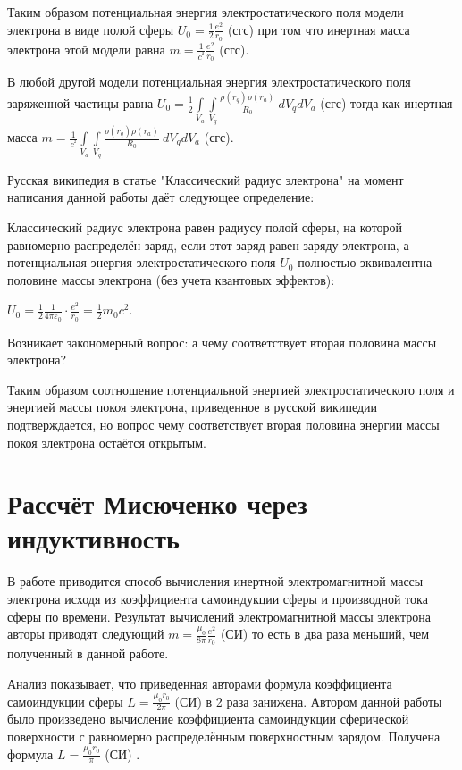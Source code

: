 \documentclass{article}
\begin{document}
Таким образом потенциальная энергия электростатического поля модели электрона в виде полой сферы 
${U}_{0} =\frac{1}{2}\frac{e^2}{{{r}_{0}}}$ (сгс)
при том что инертная масса электрона этой модели равна
$m =\frac{1}{{{c}^{^{2}}}}\frac{e^2}{{{r}_{0}}}$ (сгс).

В любой другой модели потенциальная энергия электростатического поля заряженной частицы равна
${U}_{0}=\frac{1}{2}\int\limits_{{{V}_{a}}}{\int\limits_{{{V}_{q}}}{\frac{\rho \left( {{r}_{q}} \right)\rho \left( {{r}_{a}} \right)}{R_{0}}}}\ d{{V}_{q}}d{{V}_{a}}$ (сгс)
тогда как инертная масса 
$m=\frac{1}{{{c}^{^{2}}}}\int\limits_{{{V}_{a}}}{\int\limits_{{{V}_{q}}}{\frac{\rho \left( {{r}_{q}} \right)\rho \left( {{r}_{a}} \right)}{R_{0}}}}\ d{{V}_{q}}d{{V}_{a}}$ (сгс).

Русская википедия в статье "Классический радиус электрона"  на момент написания данной работы даёт следующее определение:

Классический радиус электрона равен радиусу полой сферы, на которой равномерно распределён заряд, если этот заряд равен заряду электрона, а потенциальная энергия электростатического поля ${U}_{0}$  полностью эквивалентна половине массы электрона (без учета квантовых эффектов):

${\displaystyle U_{0}={\frac {1}{2}}{\frac {1}{4\pi \varepsilon _{0}}}\cdot {\frac {e^{2}}{r_{0}}}={\frac {1}{2}}m_{0}c^{2}}$.

Возникает закономерный вопрос: а чему соответствует вторая половина массы электрона?


Таким образом соотношение потенциальной энергией электростатического поля и энергией массы покоя электрона, приведенное в русской википедии подтверждается, но вопрос чему соответствует вторая половина энергии массы покоя электрона остаётся открытым.

\section{Рассчёт Мисюченко через индуктивность}

В работе \cite{misyuchenko} приводится способ вычисления инертной электромагнитной массы электрона исходя из коэффициента самоиндукции сферы и производной тока сферы по времени. Результат вычислений электромагнитной массы электрона авторы приводят следующий $m =\frac{{{\mu }_{0}}}{8\pi }\frac{e^2}{{{r}_{0}}}$ (СИ) то есть в два раза меньший, чем полученный в данной работе.

Анализ показывает, что приведенная авторами формула коэффициента самоиндукции сферы $L =\frac{{{\mu }_{0}}{r}_{0}}{2\pi }$ (СИ) в 2 раза занижена. Автором данной работы было произведено вычисление коэффициента самоиндукции сферической поверхности с равномерно распределённым поверхностным зарядом. Получена формула $L =\frac{{{\mu }_{0}}{r}_{0}}{\pi }$ (СИ) .
\end{document}
